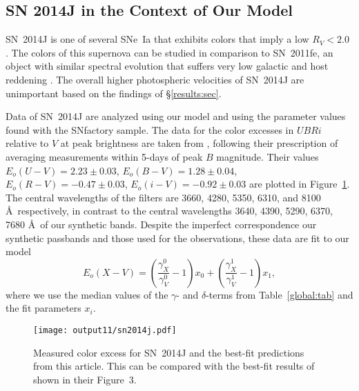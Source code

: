 \documentclass{aastex61}   	%
\begin{document}
\subsection{SN 2014J in the Context of Our Model}
\label{sn2014j:sec}

SN~2014J   is one of several SNe~Ia that exhibits colors that imply a low $R_V<2.0$ \citep{2014ApJ...788L..21A, 2014MNRAS.443.2887F, 
2014arXiv1411.3332J,
2014ApJ...795L...4K, 2015ApJ...805...74B}.
The colors of this supernova can be studied in comparison to SN~2011fe, an object with similar
spectral evolution that 
suffers very low galactic and host reddening
\citep[this technique has been used in][]{2006MNRAS.369.1880E,2007AJ....133...58K,2008MNRAS.384..107E,2010AJ....139..120F, 2014ApJ...788L..21A}.
The overall higher photospheric velocities of
SN~2014J are unimportant  based on the findings of  \S\ref{results:sec}.

Data of SN~2014J are  analyzed using our model and using the parameter values found with the SNfactory sample.
The data for the color excesses  in $UBRi$  relative to $V$ at peak brightness  are taken from \citet{2014ApJ...788L..21A},
following their prescription of averaging measurements within 5-days of peak $B$ magnitude.
Their values 
$E_o(U-V) =   2.23 \pm   0.03$,
$E_o(B-V) =   1.28 \pm   0.04$,
$E_o(R-V) =  -0.47 \pm   0.03$,
$E_o(i-V) =  -0.92 \pm   0.03$
are plotted in Figure~\ref{sn2014j:fig}.
\color{red}
The central wavelengths of the filters are 3660, 4280, 5350, 6310, and 8100 \AA\ respectively, in contrast to the central
wavelengths 
3640, 4390, 5290, 6370, 7680 \AA\ of our synthetic bands.  Despite the imperfect correspondence our synthetic passbands
and those used for the observations,
\color{black}
these data are fit to our model
\begin{equation}
E_o(X-V) =  \left(\frac{\gamma^0_X}{\gamma^0_V}-1\right)x_0 +  \left(\frac{\gamma^1_X}{\gamma^1_V}-1\right)x_1,
\end{equation}
where we use the median values of the $\gamma$- and $\delta$-terms from Table~\ref{global:tab} and the fit
parameters $x_i $.

\begin{figure}[htbp] %
   \centering
   \texttt{[image: output11/sn2014j.pdf]} 
   \caption{Measured color excess for SN~2014J and the best-fit predictions from this article. 
   \color{red}
   This can be compared with the best-fit results of
   \citet{2014ApJ...788L..21A} shown in their Figure~3.
   \color{black}
   \label{sn2014j:fig}}
\end{figure}
\end{document}
